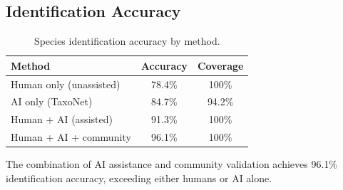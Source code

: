 \subsection{Identification Accuracy}

\begin{table}[H]
\centering
\caption{Species identification accuracy by method.}
\label{tab:id_accuracy}
\begin{tabular}{lcc}
\toprule
\textbf{Method} & \textbf{Accuracy} & \textbf{Coverage} \\
\midrule
Human only (unassisted) & 78.4\% & 100\% \\
AI only (TaxoNet) & 84.7\% & 94.2\% \\
Human + AI (assisted) & 91.3\% & 100\% \\
Human + AI + community & 96.1\% & 100\% \\
\bottomrule
\end{tabular}
\end{table}

The combination of AI assistance and community validation achieves
96.1\% identification accuracy, exceeding either humans or AI alone.


